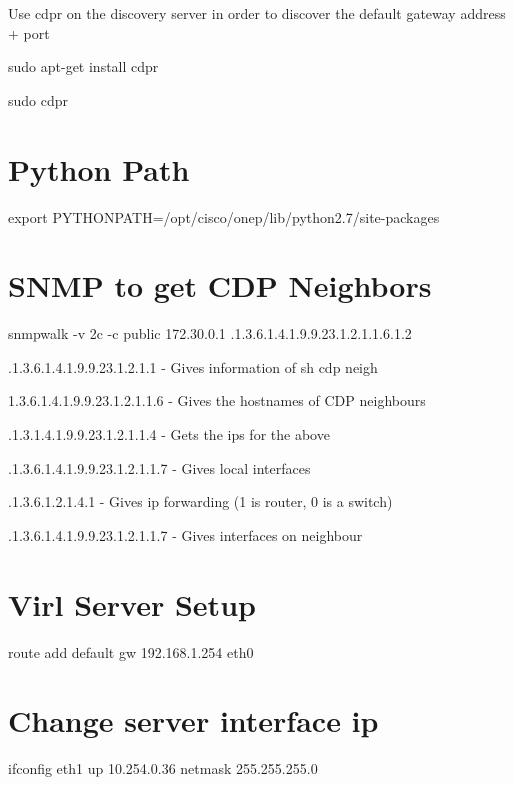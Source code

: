 \documentclass[11pt]{report}
\begin{document}
Use cdpr on the discovery server in order to discover the default gateway address + port

sudo apt-get install cdpr

sudo cdpr

\section*{Python Path}

 export PYTHONPATH=/opt/cisco/onep/lib/python2.7/site-packages
 
\section*{SNMP to get CDP Neighbors}

snmpwalk -v 2c -c public 172.30.0.1 .1.3.6.1.4.1.9.9.23.1.2.1.1.6.1.2

.1.3.6.1.4.1.9.9.23.1.2.1.1 - Gives information of sh cdp neigh

1.3.6.1.4.1.9.9.23.1.2.1.1.6  - Gives the hostnames of CDP neighbours 

.1.3.1.4.1.9.9.23.1.2.1.1.4 - Gets the ips for the above

.1.3.6.1.4.1.9.9.23.1.2.1.1.7 - Gives local interfaces

.1.3.6.1.2.1.4.1 - Gives ip forwarding (1 is router, 0 is a switch)

.1.3.6.1.4.1.9.9.23.1.2.1.1.7 - Gives interfaces on neighbour

\section{Virl Server Setup}
route add default gw 192.168.1.254 eth0

\section{Change server interface ip}
ifconfig eth1 up 10.254.0.36 netmask 255.255.255.0



\end{document}
